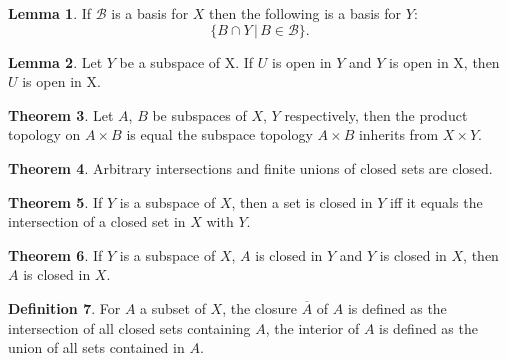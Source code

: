 \documentclass[twocolumn]{article}
\theoremstyle{definition}
\newtheorem{definition}{Definition}[section]
\newtheorem{theorem}[definition]{Theorem}
\newtheorem{lemma}[definition]{Lemma}
\begin{document}
\begin{lemma}
    If $\mathcal{B}$ is a basis for $X$ then the following is a basis for $Y$:
    \begin{equation}
        \{ B \cap Y \, | \, B \in \mathcal{B} \}.
    \end{equation}
\end{lemma}
\begin{lemma}
    Let $Y$ be a subspace of X. If $U$ is open in $Y$ and $Y$ is open in X, then $U$ is open in X.
\end{lemma}
\begin{theorem}
    Let $A$, $B$ be subspaces of $X$, $Y$ respectively, then the product topology on $A \times B$ is
    equal the subspace topology $A \times B$ inherits from $X \times Y$.
\end{theorem}
\begin{theorem}
    Arbitrary intersections and finite unions of closed sets are closed.
\end{theorem}
\begin{theorem}
    If $Y$ is a subspace of $X$, then a set is closed in $Y$ iff it equals the intersection of a closed set in $X$ with $Y$.
\end{theorem}
\begin{theorem}
    If $Y$ is a subspace of $X$, $A$ is closed in $Y$ and $Y$ is closed in $X$, then $A$ is closed in $X$.
\end{theorem}
\begin{definition}
    For $A$ a subset of $X$, the closure $\overline{A}$ of $A$ is defined as the intersection of all closed sets containing $A$,
    the interior of $A$ is defined as the union of all sets contained in $A$.
\end{definition}
\end{document}
